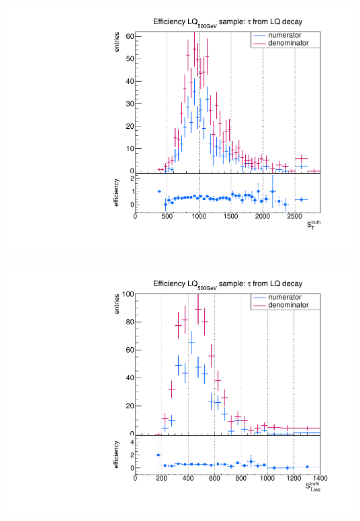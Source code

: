\begin{figure}
  \centering
                \begin{subfigure}[t]{0.49\textwidth}
                \includegraphics[width=\textwidth]{figures/plots/LQ75/Divided_fromLQST.pdf}
                \label{DividedFromLQ:signal:STLQ75}
                \end{subfigure}
                \begin{subfigure}[t]{0.49\textwidth}
                \includegraphics[width=\textwidth]{figures/plots/LQ75/Divided_fromLQSTlep.pdf}

\end{subfigure}
\end{figure}
